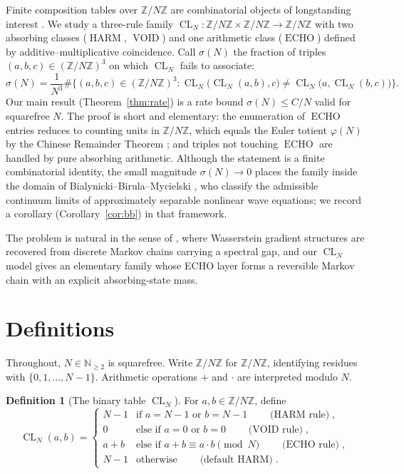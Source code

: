 \documentclass[11pt,reqno]{amsart}
\theoremstyle{plain}
\theoremstyle{definition}
\newtheorem{definition}[theorem]{Definition}
\theoremstyle{remark}
\DeclareMathOperator{\CL}{CL}
\DeclareMathOperator{\ECHO}{ECHO}
\DeclareMathOperator{\HARM}{HARM}
\DeclareMathOperator{\VOID}{VOID}
\newcommand{\ZN}{\mathbb{Z}/N\mathbb{Z}}
\newcommand{\Z}{\mathbb{Z}}
\newcommand{\N}{\mathbb{N}}
\begin{document}
Finite composition tables over $\ZN$ are combinatorial objects of
longstanding interest \cite{Birkhoff1940,Ore1942,DummitFoote2004,Lang2002}.
We study a three-rule family $\CL_N:\ZN\times\ZN\to\ZN$ with two
absorbing classes ($\HARM$, $\VOID$) and one arithmetic class
($\ECHO$) defined by additive--multiplicative coincidence. Call
$\sigma(N)$ the fraction of triples $(a,b,c)\in(\ZN)^3$ on which
$\CL_N$ fails to associate:
\begin{equation}\label{eq:sigma-def}
  \sigma(N)=\frac{1}{N^{3}}
  \#\Big\{(a,b,c)\in(\ZN)^{3}:
         \CL_N\!\big(\CL_N(a,b),c\big)\neq\CL_N\!\big(a,\CL_N(b,c)\big)\Big\}.
\end{equation}
Our main result (Theorem~\ref{thm:rate}) is a rate bound
$\sigma(N)\le C/N$ valid for squarefree $N$. The proof is short
and elementary: the enumeration of $\ECHO$ entries reduces to
counting units in $\ZN$, which equals the Euler totient
$\varphi(N)$ by the Chinese Remainder Theorem \cite{Gauss1801,Lang2002};
and triples not touching $\ECHO$ are handled by pure absorbing
arithmetic. Although the statement is a finite combinatorial
identity, the small magnitude $\sigma(N)\to 0$ places the family
inside the domain of Bialynicki--Birula--Mycielski
\cite{BB1976}, who classify the admissible continuum limits of
approximately separable nonlinear wave equations; we record a
corollary (Corollary~\ref{cor:bb}) in that framework.

The problem is natural in the sense of \cite{JKO1998,Maas2011,CHLZ2012,GigliMaas2013},
where Wasserstein gradient structures are recovered from discrete
Markov chains carrying a spectral gap, and our $\CL_N$ model gives
an elementary family whose ECHO layer forms a reversible Markov
chain with an explicit absorbing-state mass.

\section{Definitions}\label{sec:def}

Throughout, $N\in\N_{\ge 2}$ is squarefree. Write $\ZN$ for
$\Z/N\Z$, identifying residues with $\{0,1,\dots,N-1\}$. Arithmetic
operations $+$ and $\cdot$ are interpreted modulo $N$.

\begin{definition}[The binary table $\CL_N$]\label{def:cl}
For $a,b\in\ZN$, define
\begin{equation}\label{eq:cl-def}
  \CL_N(a,b)=
  \begin{cases}
     N-1 & \text{if } a=N-1 \text{ or } b=N-1
           \qquad\text{($\HARM$ rule)},\\[1pt]
     0   & \text{else if } a=0 \text{ or } b=0
           \qquad\text{($\VOID$ rule)},\\[1pt]
     a+b & \text{else if } a+b\equiv a\cdot b\pmod N
           \qquad\text{($\ECHO$ rule)},\\[1pt]
     N-1 & \text{otherwise}
           \qquad\text{(default $\HARM$)}.
  \end{cases}
\end{equation}
\end{definition}
\end{document}
